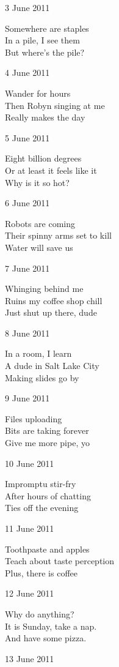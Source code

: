 \documentclass[12pt]{article}
\begin{document}
3 June 2011

Somewhere are staples \\
In a pile, I see them \\
But where's the pile?

4 June 2011

Wander for hours \\
Then Robyn singing at me \\
Really makes the day

5 June 2011

Eight billion degrees \\
Or at least it feels like it \\
Why is it so hot?

6 June 2011

Robots are coming \\
Their spinny arms set to kill \\
Water will save us

7 June 2011

Whinging behind me \\
Ruins my coffee shop chill \\
Just shut up there, dude

8 June 2011

In a room, I learn \\
A dude in Salt Lake City \\
Making slides go by

9 June 2011

Files uploading \\
Bits are taking forever \\
Give me more pipe, yo



\newpage

10 June 2011

Impromptu stir-fry \\
After hours of chatting \\
Ties off the evening

11 June 2011

Toothpaste and apples \\
Teach about taste perception \\
Plus, there is coffee

12 June 2011

Why do anything? \\
It is Sunday, take a nap. \\
And have some pizza.

13 June 2011
\end{document}
